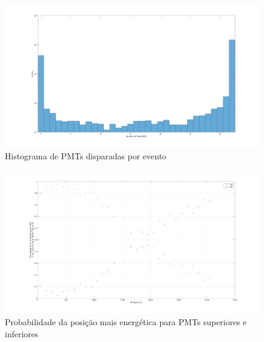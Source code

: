 \begin{figure}[H]
	\centering
	\includegraphics[width=16cm]{postextuais/apendice/simantes/firedpmt.png}
	\caption{Histograma de PMTs disparadas por evento}
	\label{fig:transf}
\end{figure}

\begin{figure}[H]
	\centering
	\includegraphics[width=16cm]{postextuais/apendice/simantes/probsupinf.png}
	\caption{Probabilidade da posição mais energética para PMTs superiores e inferiores}
	\label{fig:transf}
\end{figure}